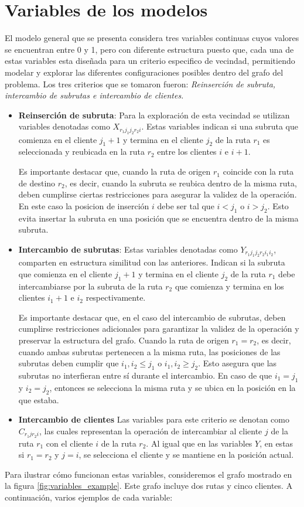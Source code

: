 \documentclass{article}
\begin{document}
\section {Variables de los modelos}
El modelo general que se presenta considera tres variables continuas cuyos valores se encuentran entre 0 y 1, pero con diferente estructura puesto que, cada una de estas variables esta diseñada para un criterio especifico de vecindad, permitiendo modelar y explorar las diferentes configuraciones posibles dentro del grafo del problema. Los tres criterios que se tomaron fueron: \textit{Reinserción de subruta, intercambio de subrutas e intercambio de clientes.}
\begin{itemize}
\item \textbf{Reinserción de subruta}:
Para la exploración de esta vecindad se utilizan variables denotadas como $X_{r_1 j_1 j_2 r_2 i}$. Estas variables indican si una subruta que comienza en el cliente $j_1 +1$ y termina en el cliente $j_2$ de la ruta $r_1$ es seleccionada y reubicada en la ruta $r_2$ entre los clientes $i$ e $i+1$. 

Es importante destacar que, cuando la ruta de origen $r_1$ coincide con la ruta de destino $r_2$, es decir, cuando la subruta se reubica dentro de la misma ruta, deben cumplirse ciertas restricciones para asegurar la validez de la operación. En este caso la posicion de inserción $i$ debe ser tal que $i < j_1$ o $i>j_2$. Esto evita insertar la subruta en una posición que se encuentra dentro de la misma subruta.

 
\item \textbf {Intercambio de subrutas}:
Estas variables denotadas como $Y_{r_1j_1j_2r_2i_1i_2}$, comparten en estructura similitud con las anteriores. Indican si la subruta que comienza en el cliente $j_1+1$ y termina en el cliente $j_2$ de la ruta $r_1$ debe intercambiarse por la subruta de la ruta $r_2$ que comienza y termina en los clientes $i_1+1$ e $i_2$ respectivamente.

Es importante destacar que, en el caso del intercambio de subrutas, deben cumplirse restricciones adicionales para garantizar la validez de la operación y preservar la estructura del grafo. Cuando la ruta de origen $r_1 = r_2$, es decir, cuando ambas subrutas pertenecen a la misma ruta, las posiciones de las subrutas deben cumplir que $i_1,i_2 \leq j_1$ o $i_1,i_2 \geq j_2$. Esto asegura que las subrutas no interfieran entre sí durante el intercambio. En caso de que $i_1=j_1$ y $i_2 = j_2$, entonces se selecciona la misma ruta y se ubica en la posición en la que estaba.

\item \textbf {Intercambio de clientes}
Las variables para este criterio se denotan como $C_{r_1jr_2i}$, las cuales representan la operación de intercambiar al cliente $j$ de la ruta $r_1$ con el cliente $i$ de la ruta $r_2$. Al igual que en las variables $Y$, en estas si $r_1 = r_2$ y $j=i$, se selecciona el cliente y se mantiene en la posición actual.
\end{itemize}
Para ilustrar cómo funcionan estas variables, consideremos el grafo mostrado en la figura \ref{fig:variables_example}. Este grafo incluye dos rutas y cinco clientes. A continuación, varios ejemplos de cada variable:
\end{document}

